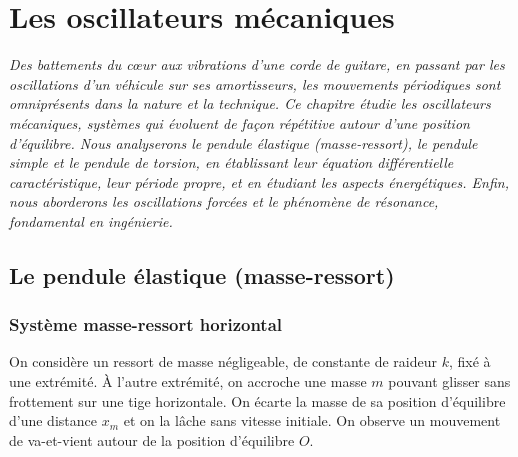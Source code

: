 \chapter{Les oscillateurs mécaniques}

\textit{Des battements du cœur aux vibrations d'une corde de guitare, en passant par les oscillations d'un véhicule sur ses amortisseurs, les mouvements périodiques sont omniprésents dans la nature et la technique. Ce chapitre étudie les oscillateurs mécaniques, systèmes qui évoluent de façon répétitive autour d'une position d'équilibre. Nous analyserons le pendule élastique (masse-ressort), le pendule simple et le pendule de torsion, en établissant leur équation différentielle caractéristique, leur période propre, et en étudiant les aspects énergétiques. Enfin, nous aborderons les oscillations forcées et le phénomène de résonance, fondamental en ingénierie.}

\section{Le pendule élastique (masse-ressort)}

\subsection{Système masse-ressort horizontal}

\begin{experience}
On considère un ressort de masse négligeable, de constante de raideur $k$, fixé à une extrémité. À l'autre extrémité, on accroche une masse $m$ pouvant glisser sans frottement sur une tige horizontale. On écarte la masse de sa position d'équilibre d'une distance $x_m$ et on la lâche sans vitesse initiale. On observe un mouvement de va-et-vient autour de la position d'équilibre $O$.
\end{experience}

\begin{illus}
\end{illus}

